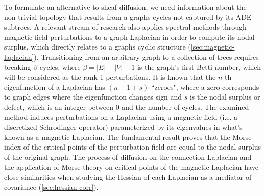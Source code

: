 \documentclass{article}
\theoremstyle{definition}
\begin{document}
To formulate an alternative to sheaf diffusion, we need information about the non-trivial topology that results from a graphs cycles not captured by its ADE subtrees.
A relevant stream of research also applies spectral methods through magnetic field perturbations to a graph Laplacian in order to compute its nodal surplus, which directly relates to a graphs cyclic structure (\cref{sec:magnetic-laplacian}).  
Transitioning from an arbitrary graph to a collection of trees requires breaking $\beta$ cycles, where $\beta = |E| - |V| + 1$ is the graph's first Betti number, which will be considered as the rank 1 perturbations.
It is known that the $n$-th eigenfunction of a Laplacian has $(n - 1 + s)$ ``zeroes", where a zero corresponds to graph edges where the eigenfunction changes sign and $s$ is the nodal surplus or defect, which is an integer between $0$ and the number of cycles. 
The examined method induces perturbations on a Laplacian using a magnetic field (i.e. a discretized Schrodinger operator) parameterized by its eigenvalues in what's known as a magnetic Laplacian. The fundamental result proves that the Morse index of the critical points of the perturbation field are equal to the nodal surplus of the original graph.
The process of diffusion on the connection Laplacian and the application of Morse theory on critical points of the magnetic Laplacian have close similarities when studying the Hessian of each Laplacian as a mediator of covariance (\cref{sec:hessian-corr}).
\end{document}
